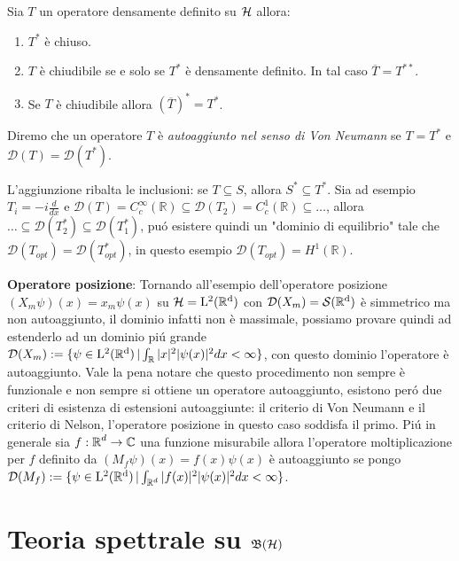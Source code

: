 \begin{theorem}
    Sia $T$ un operatore densamente definito su $\operatorname{\mathcal{H}}$ allora: 
\begin{enumerate}
    \item $T^*$ è chiuso.
    \item $T$ è chiudibile se e solo se $T^*$ è densamente definito. In tal caso $\overline{T} = T^{**}$.
    \item Se $T$ è chiudibile allora $(\overline{T})^* = T^*$.
\end{enumerate}
\end{theorem}

\begin{definition}
    Diremo che un operatore $T$ è \emph{autoaggiunto nel senso di Von Neumann} se $T = T^*$ e $\mathcal{D}(T) = \mathcal{D}(T^*)$.
\end{definition}

\begin{observation}
L'aggiunzione ribalta le inclusioni: se $T \subseteq S$, allora $S^* \subseteq T^*$. Sia ad esempio $T_i = -i \frac{d}{dx}$ e $\mathcal{D}(T) = C_c^\infty(\mathbb{R})\subseteq \mathcal{D}(T_2) = C_c^1(\mathbb{R} ) \subseteq \dots $, allora $\dots \subseteq \mathcal{D}(T^*_2) \subseteq \mathcal{D}(T^*_1)$, puó esistere quindi un "dominio di equilibrio" tale che $\mathcal{D}(T_{opt})=\mathcal{D}(T^*_{opt})$, in questo esempio $\mathcal{D}(T_{opt}) = H^1(\mathbb{R})$.
\end{observation}   

\textbf{Operatore posizione}: Tornando all'esempio dell'operatore posizione $(X_m\psi)(x)= x_m\psi(x)$ su $\operatorname{\mathcal{H}} = \operatorname{L^2(\mathbb{R}^d)}$ con $\mathcal{D}(X_m) = \operatorname{\mathcal{S}(\mathbb{R}^d)}$ è simmetrico ma non autoaggiunto, il dominio infatti non è massimale, possiamo provare quindi ad estenderlo ad un dominio piú grande $\mathcal{D}(X_m):= \{ \psi \in \operatorname{L^2(\mathbb{R}^d)} | \int_{\operatorname{\mathbb{R}}} |x|^2 |\psi(x)|^2 dx < \infty \}$, con questo dominio l'operatore è autoaggiunto. Vale la pena notare che questo procedimento non sempre è funzionale e non sempre si ottiene un operatore autoaggiunto, esistono peró due criteri di esistenza di estensioni autoaggiunte: il criterio di Von Neumann e il criterio di Nelson, l'operatore posizione in questo caso soddisfa il primo. Piú in generale sia $f : \operatorname{\mathbb{R}}^d \to \mathbb{C}$ una funzione misurabile allora l'operatore moltiplicazione per $f$ definito da $(M_f \psi)(x) = f(x)\psi(x)$ è autoaggiunto se pongo $\mathcal{D}(M_f):=\{ \psi \in \operatorname{L^2(\mathbb{R}^d)} | \int_{\operatorname{\mathbb{R}}^d} |f(x)|^2 |\psi(x)|^2 dx < \infty \}$. 


\section{Teoria spettrale su $\operatorname{\mathfrak{B}(\mathcal{H})}$}

